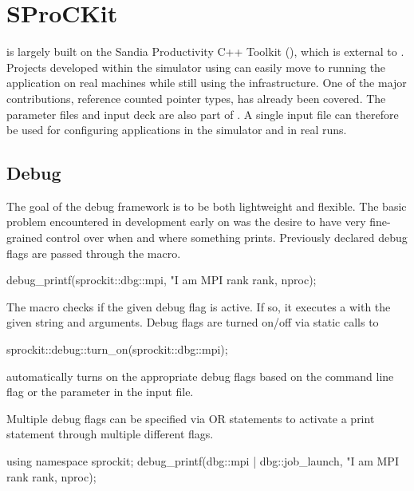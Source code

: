 
\chapter{SProCKit}
\sstmacro is largely built on the Sandia Productivity C++ Toolkit (\sprockit),
which is external to \sstmacro.
Projects developed within the simulator using \sprockit can easily 
move to running the application on real machines while still using the \sprockit infrastructure.
One of the major contributions, reference counted pointer types, has already been covered.
The parameter files and input deck are also part of \sprockit.
A single input file can therefore be used for configuring applications in the simulator and in real runs.


\section{Debug}
The goal of the \sprockit debug framework is to be both lightweight and flexible.
The basic problem encountered in \sstmacro development early on was the desire to have very fine-grained control over when and where something prints.
Previously declared debug flags are passed through the  macro.

\begin{CppCode}
debug_printf(sprockit::dbg::mpi,
  "I am MPI rank %
  rank, nproc);
\end{CppCode}

The macro checks if the given debug flag is active. 
If so, it executes a  with the given string and arguments.
Debug flags are turned on/off via static calls to

\begin{CppCode}
sprockit::debug::turn_on(sprockit::dbg::mpi);
\end{CppCode}

\sstmacro automatically turns on the appropriate debug flags based on the  command line flag
or the  parameter in the input file.

Multiple debug flags can be specified via OR statements to activate a print statement through multiple different flags.

\begin{CppCode}
using namespace sprockit;
debug_printf(dbg::mpi | dbg::job_launch,
  "I am MPI rank %
  rank, nproc);
\end{CppCode}


